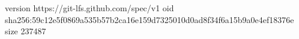 version https://git-lfs.github.com/spec/v1
oid sha256:59c12e5f0869a535b57b2ca16e159d7325010d0ad8f34f6a15b9a0e4ef18376e
size 237487
